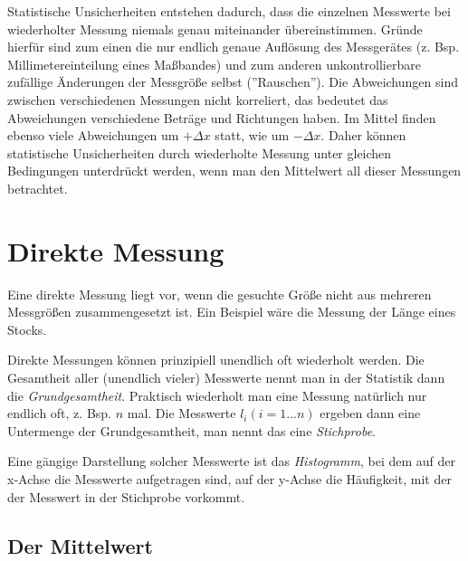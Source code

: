 \label{ssect:StatistUnsicher}
Statistische Unsicherheiten entstehen dadurch, dass die einzelnen Messwerte bei wiederholter Messung niemals genau miteinander übereinstimmen. Gründe hierfür sind zum einen die nur endlich genaue Auflösung des Messgerätes (z. Bsp. Millimetereinteilung eines Maßbandes) und zum anderen unkontrollierbare zufällige Änderungen der Messgröße selbst (''Rauschen''). Die Abweichungen sind zwischen verschiedenen Messungen nicht korreliert, das bedeutet das Abweichungen verschiedene Beträge und Richtungen haben. Im Mittel finden ebenso viele Abweichungen um $+\Delta x$ statt, wie um $-\Delta x$. Daher können statistische Unsicherheiten durch wiederholte Messung unter gleichen Bedingungen unterdrückt werden, wenn man den Mittelwert all dieser Messungen betrachtet.

\section{Direkte Messung} \label{chap:Direkt}

Eine direkte Messung liegt vor, wenn die gesuchte Größe nicht aus mehreren Messgrößen zusammengesetzt ist. Ein Beispiel wäre die Messung der Länge eines Stocks.

Direkte Messungen können prinzipiell unendlich oft wiederholt werden. Die Gesamtheit aller (unendlich vieler) Messwerte nennt man in der Statistik dann die \textit{Grundgesamtheit}. Praktisch wiederholt man eine Messung natürlich nur endlich oft, z. Bsp. $n$ mal. Die Messwerte $l_i (i=1...n)$ ergeben dann eine Untermenge der Grundgesamtheit, man nennt das eine \textit{Stichprobe}. 

Eine gängige Darstellung solcher Messwerte ist das \textit{Histogramm}, bei dem auf der x-Achse die Messwerte aufgetragen sind, auf der y-Achse die Häufigkeit, mit der der Messwert in der Stichprobe vorkommt.


\subsection{Der Mittelwert}

